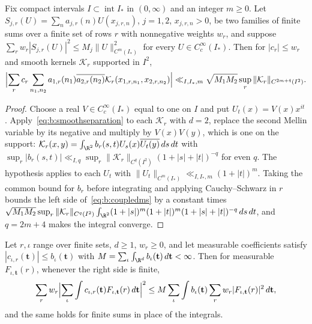 \begin{lemma}\label{lem:b:smoothms}
Fix compact intervals $I\subset\operatorname{int}I_*$ in $(0,\infty)$ and an integer $m\ge0$. Let $S_{j,r}(U)=\sum_na_{j,r}(n)U(x_{j,r,n})$, $j=1,2$, $x_{j,r,n}>0$, be two families of finite sums over a finite set of rows $r$ with nonnegative weights $w_r$, and suppose $\sum_rw_r|S_{j,r}(U)|^2\le M_j\|U\|^2_{C^m(I_*)}$ for every $U\in C_c^\infty(I_*)$. Then for $|c_r|\le w_r$ and smooth kernels $\mathcal K_r$ supported in $I^2$,
\begin{equation}\label{eq:b:coupledms}
  \Bigl|\sum_rc_r\sum_{n_1,n_2}a_{1,r}(n_1)\overline{a_{2,r}(n_2)}\mathcal K_r(x_{1,r,n_1},x_{2,r,n_2})\Bigr|\ll_{I,I_*,m}\sqrt{M_1M_2}\sup_r\|\mathcal K_r\|_{C^{2m+4}(I^2)}.
\end{equation}
\end{lemma}

\begin{proof}
Choose a real $V\in C_c^\infty(I_*)$ equal to one on $I$ and put $U_t(x)=V(x)x^{it}$. Apply~\eqref{eq:b:smoothseparation} to each $\mathcal K_r$ with $d=2$, replace the second Mellin variable by its negative and multiply by $V(x)V(y)$, which is one on the support: $\mathcal K_r(x,y)=\int_{\R^2}b_r(s,t)U_s(x)\overline{U_t(y)}\dd s\dd t$ with $\sup_r|b_r(s,t)|\ll_{I,q}\sup_r\|\mathcal K_r\|_{C^q(I^2)}(1+|s|+|t|)^{-q}$ for even $q$. The hypothesis applies to each $U_t$ with $\|U_t\|_{C^m(I_*)}\ll_{I,I_*,m}(1+|t|)^m$. Taking the common bound for $b_r$ before integrating and applying Cauchy--Schwarz in $r$ bounds the left side of~\eqref{eq:b:coupledms} by a constant times $\sqrt{M_1M_2}\sup_r\|\mathcal K_r\|_{C^q(I^2)}\int_{\R^2}(1+|s|)^m(1+|t|)^m(1+|s|+|t|)^{-q}\dd s\dd t$, and $q=2m+4$ makes the integral converge.
\end{proof}

\begin{lemma}\label{lem:b:recombine}
Let $r,\iota$ range over finite sets, $d\ge1$, $w_r\ge0$, and let measurable coefficients satisfy $|c_{\iota,r}(\mathbf t)|\le b_\iota(\mathbf t)$ with $M=\sum_\iota\int_{\R^d}b_\iota(\mathbf t)\dd\mathbf t<\infty$. Then for measurable $F_{\iota,\mathbf t}(r)$, whenever the right side is finite,
\begin{equation}\label{eq:b:integralms}
  \sum_rw_r\Bigl|\sum_\iota\int c_{\iota,r}(\mathbf t)F_{\iota,\mathbf t}(r)\,d\mathbf t\Bigr|^2\le M\sum_\iota\int b_\iota(\mathbf t)\sum_rw_r|F_{\iota,\mathbf t}(r)|^2\,d\mathbf t,
\end{equation}
and the same holds for finite sums in place of the integrals.
\end{lemma}

